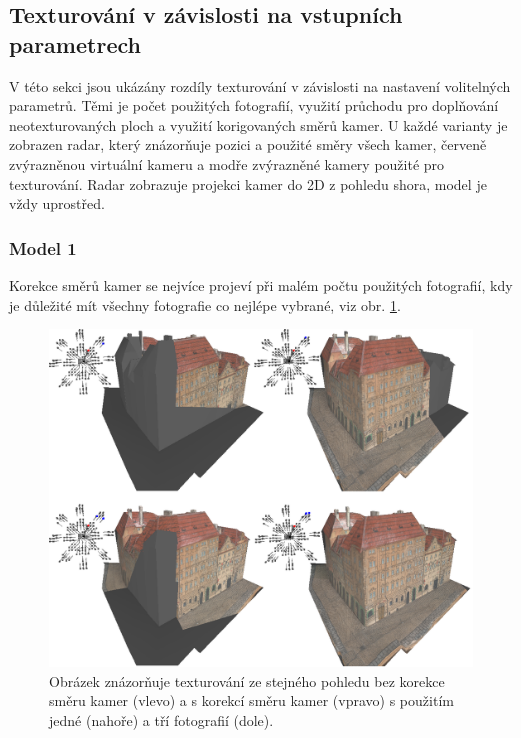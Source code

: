 \documentclass[11pt,twoside,a4paper]{book}
\begin{document}
\subsection{Texturování v závislosti na vstupních parametrech}

V této sekci jsou ukázány rozdíly texturování v závislosti na nastavení volitelných parametrů. Těmi je počet použitých fotografií, využití průchodu pro doplňování neotexturovaných ploch a využití korigovaných směrů kamer. U každé varianty je zobrazen radar, který znázorňuje pozici a použité směry všech kamer, červeně zvýrazněnou virtuální kameru a modře zvýrazněné kamery použité pro texturování. Radar zobrazuje projekci kamer do 2D z pohledu shora, model je vždy uprostřed.

\subsubsection*{Model 1}
Korekce směrů kamer se nejvíce projeví při malém počtu použitých fotografií, kdy je důležité mít všechny fotografie co nejlépe vybrané, viz obr.  \ref{fig:test-1}. 

\begin{figure}[h!]
\begin{center}
\includegraphics[width=\textwidth]{figures/test-1}
\caption{Obrázek znázorňuje texturování ze stejného pohledu bez korekce směru kamer (vlevo) a s korekcí směru kamer (vpravo) s použitím jedné (nahoře) a tří fotografií (dole).}
\label{fig:test-1}
\end{center}
\end{figure}
\end{document}
